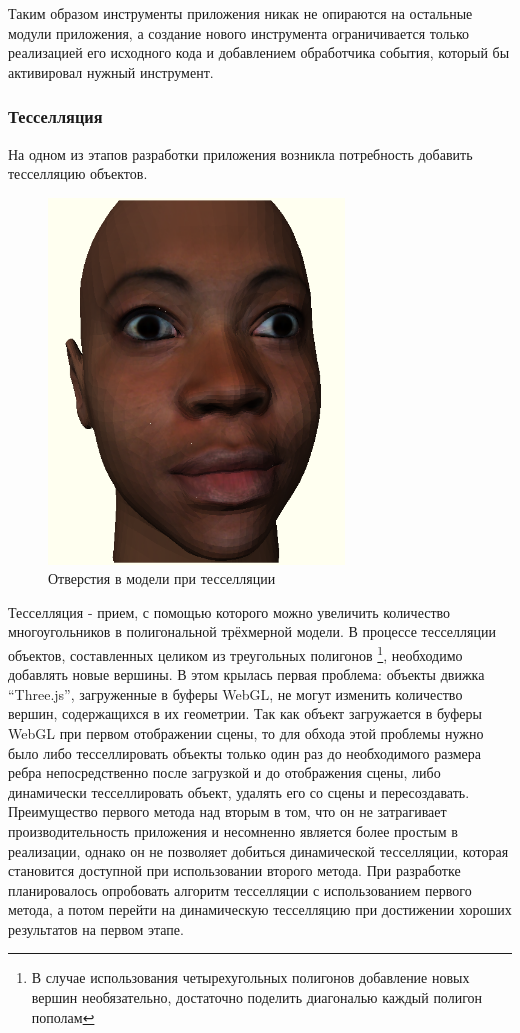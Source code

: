 \documentclass[12pt, a4paper]{article}
\begin{document}
Таким образом инструменты приложения никак не опираются на остальные
модули приложения, а создание нового инструмента ограничивается только
реализацией его исходного кода и добавлением обработчика события, который бы
активировал нужный инструмент.

\subsubsection{Тесселляция}

На одном из этапов разработки приложения возникла потребность добавить
тесселляцию объектов.

\begin{figure}[htb]
\centering
\includegraphics[width=0.7\textwidth]{holes-in-model.png}
\caption{Отверстия в модели при тесселляции}
\label{fig:holes-in-model}
\end{figure}

Тесселляция - прием, с помощью которого можно увеличить количество
многоугольников в полигональной трёхмерной модели. В процессе тесселляции
объектов, составленных целиком из треугольных полигонов \footnote{В случае
использования четырехугольных полигонов добавление новых вершин необязательно,
достаточно поделить диагональю каждый полигон пополам}, необходимо добавлять
новые вершины. В этом крылась первая проблема: объекты движка ``Three.js'',
загруженные в буферы WebGL, не могут изменить количество вершин, содержащихся в
их геометрии. Так как объект загружается в буферы WebGL при первом отображении
сцены, то для обхода этой проблемы нужно было либо тесселлировать объекты только
один раз до необходимого размера ребра непосредственно после загрузкой и до
отображения сцены, либо динамически тесселлировать объект, удалять его со сцены
и пересоздавать. Преимущество первого метода над вторым в том, что он не
затрагивает производительность приложения и несомненно является более простым в
реализации, однако он не позволяет добиться динамической тесселляции, которая
становится доступной при использовании второго метода. При разработке
планировалось опробовать алгоритм тесселляции с использованием первого метода, а
потом перейти на динамическую тесселляцию при достижении хороших результатов на
первом этапе.
\end{document}
